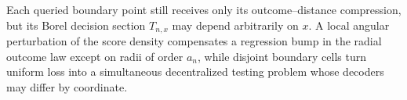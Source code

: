 Each queried boundary point still receives only its outcome--distance compression, but its Borel decision section \(T_{n,x}\) may depend arbitrarily on \(x\).  A local angular perturbation of the score density compensates a regression bump in the radial outcome law except on radii of order \(a_n\), while disjoint boundary cells turn uniform loss into a simultaneous decentralized testing problem whose decoders may differ by coordinate.